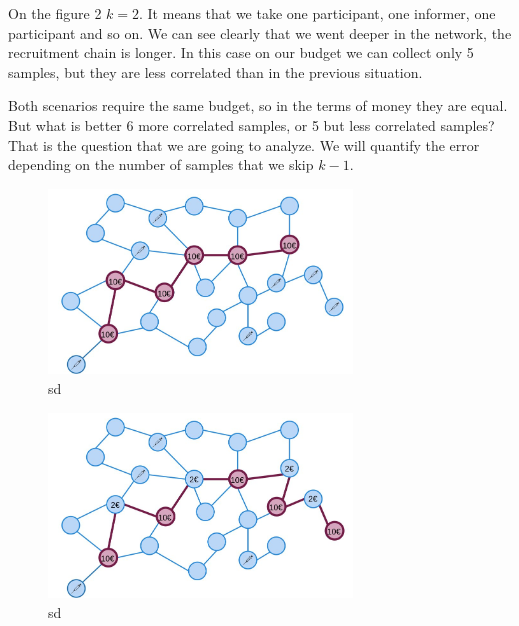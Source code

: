 \documentclass[12pt]{report}
\begin{document}
On the figure 2 $k = 2$. It means that we take one participant, one informer, one participant and so on. We can see clearly that we went deeper in the network, the recruitment chain is longer. In this case on our budget we can collect only 5 samples, but they are less correlated than in the previous situation. 

Both scenarios require the same budget, so in the terms of money they are equal. But what is better 6 more correlated samples, or 5 but less correlated samples? That is the question that we are going to analyze. We will quantify the error depending on the number of samples that we skip $k-1$.
 



\newpage

\begin{figure}[h]
  \begin{minipage}[c]{0.67\textwidth}
    \includegraphics[width=0.72\textwidth]{skipping1}
  \end{minipage}\hfill
  \begin{minipage}[c]{0.3\textwidth}
    \caption{
sd
    }
  \end{minipage}
\end{figure}

\begin{figure}[h]
  \begin{minipage}[c]{0.67\textwidth}
    \includegraphics[width=0.72\textwidth]{skipping2}
  \end{minipage}\hfill
  \begin{minipage}[c]{0.3\textwidth}
    \caption{
sd
    }
  \end{minipage}
\end{figure}
\end{document}
